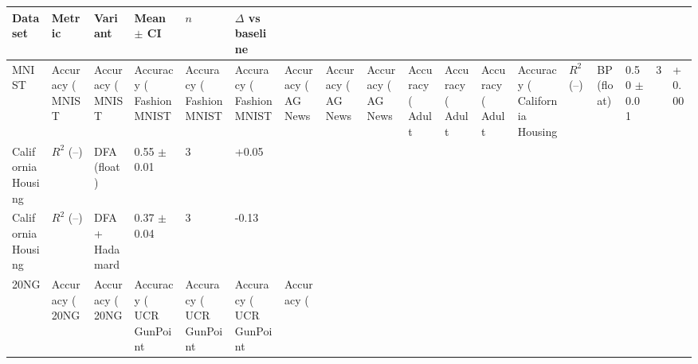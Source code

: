 \begin{tabular}{llllll}
\hline
Dataset & Metric & Variant & Mean $\pm$ CI & $n$ & $\Delta$ vs baseline \\
\hline
MNIST & Accuracy (%
MNIST & Accuracy (%
MNIST & Accuracy (%
\hline
Fashion MNIST & Accuracy (%
Fashion MNIST & Accuracy (%
Fashion MNIST & Accuracy (%
\hline
AG News & Accuracy (%
AG News & Accuracy (%
AG News & Accuracy (%
\hline
Adult & Accuracy (%
Adult & Accuracy (%
Adult & Accuracy (%
\hline
California Housing & $R^2$ (--) & BP (float) & 0.50 $\pm$ 0.01 & 3 & +0.00 \\
California Housing & $R^2$ (--) & DFA (float) & 0.55 $\pm$ 0.01 & 3 & +0.05 \\
California Housing & $R^2$ (--) & DFA + Hadamard & 0.37 $\pm$ 0.04 & 3 & -0.13 \\
\hline
20NG & Accuracy (%
20NG & Accuracy (%
20NG & Accuracy (%
\hline
UCR GunPoint & Accuracy (%
UCR GunPoint & Accuracy (%
UCR GunPoint & Accuracy (%
\hline
\end{tabular}
